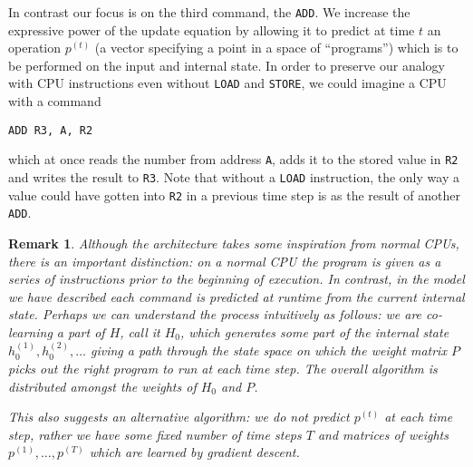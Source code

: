 \documentclass[english,letter paper,12pt,leqno]{article}
\theoremstyle{example}
\newtheorem{remark}[theorem]{Remark}
\numberwithin{equation}{section}
\begin{document}
In contrast our focus is on the third command, the \verb+ADD+. We increase the expressive power of the update equation by allowing it to predict at time $t$ an operation $p^{(t)}$ (a vector specifying a point in a space of ``programs'') which is to be performed on the input and internal state. In order to preserve our analogy with CPU instructions even without \verb+LOAD+ and \verb+STORE+, we could imagine a CPU with a command
\begin{verbatim}
ADD R3, A, R2
\end{verbatim}
which at once reads the number from address \verb+A+, adds it to the stored value in \verb+R2+ and writes the result to \verb+R3+. Note that without a \verb+LOAD+ instruction, the only way a value could have gotten into \verb+R2+ in a previous time step is as the result of another \verb+ADD+.

\begin{remark} Although the architecture takes some inspiration from normal CPUs, there is an important distinction: on a normal CPU the program is given as a series of instructions prior to the beginning of execution. In contrast, in the model we have described each command is \emph{predicted} at runtime from the current internal state. Perhaps we can understand the process intuitively as follows: we are co-learning a part of $H$, call it $H_0$, which generates some part of the internal state $h^{(1)}_{0}, h^{(2)}_{0}, \ldots$ giving a path through the state space on which the weight matrix $P$ picks out the right program to run at each time step. The overall algorithm is distributed amongst the weights of $H_0$ and $P$.

This also suggests an alternative algorithm: we do not predict $p^{(t)}$ at each time step, rather we have some fixed number of time steps $T$ and matrices of weights $p^{(1)}, \ldots, p^{(T)}$ which are learned by gradient descent.
\end{remark}
\end{document}
